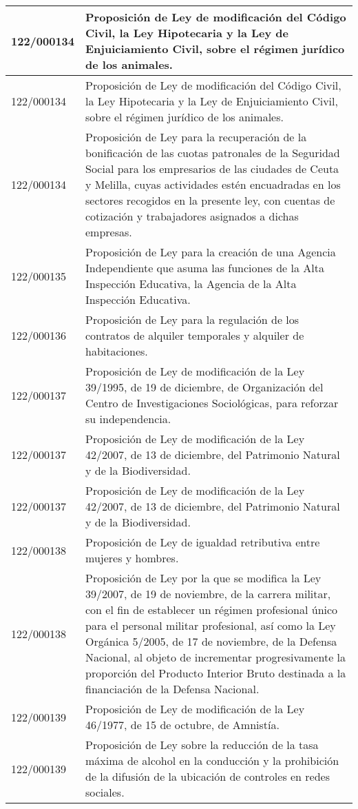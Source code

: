 {\begin{table}[H]
\begin{center}
\begin{tabularx}{\linewidth}{| l | X |}
\hline
122/000134 & Proposición de Ley de modificación del Código Civil, la Ley Hipotecaria y la Ley de Enjuiciamiento Civil, sobre el régimen jurídico de los animales. \\
\hline
122/000134 & Proposición de Ley de modificación del Código Civil, la Ley Hipotecaria y la Ley de Enjuiciamiento Civil, sobre el régimen jurídico de los animales. \\
\hline
122/000134 & Proposición de Ley para la recuperación de la bonificación de las cuotas patronales de la Seguridad Social para los empresarios de las ciudades de Ceuta y Melilla, cuyas actividades estén encuadradas en los sectores recogidos en la presente ley, con cuentas de cotización y trabajadores asignados a dichas empresas. \\
\hline
122/000135 & Proposición de Ley para la creación de una Agencia Independiente que asuma las funciones de la Alta Inspección Educativa, la Agencia de la Alta Inspección Educativa. \\
\hline
122/000136 & Proposición de Ley para la regulación de los contratos de alquiler temporales y alquiler de habitaciones. \\
\hline
122/000137 & Proposición de Ley de modificación de la Ley 39/1995, de 19 de diciembre, de Organización del Centro de Investigaciones Sociológicas, para reforzar su independencia. \\
\hline
122/000137 & Proposición de Ley de modificación de la Ley 42/2007, de 13 de diciembre, del Patrimonio Natural y de la Biodiversidad. \\
\hline
122/000137 & Proposición de Ley de modificación de la Ley 42/2007, de 13 de diciembre, del Patrimonio Natural y de la Biodiversidad. \\
\hline
122/000138 & Proposición de Ley de igualdad retributiva entre mujeres y hombres. \\
\hline
122/000138 & Proposición de Ley por la que se modifica la Ley 39/2007, de 19 de noviembre, de la carrera militar, con el fin de establecer un régimen profesional único para el personal militar profesional, así como la Ley Orgánica 5/2005, de 17 de noviembre, de la Defensa Nacional, al objeto de incrementar progresivamente la proporción del Producto Interior Bruto destinada a la financiación de la Defensa Nacional. \\
\hline
122/000139 & Proposición de Ley de modificación de la Ley 46/1977, de 15 de octubre, de Amnistía. \\
\hline
122/000139 & Proposición de Ley sobre la reducción de la tasa máxima de alcohol en la conducción y la prohibición de la difusión de la ubicación de controles en redes sociales. \\

\end{tabularx}
\end{center}
\end{table}}
